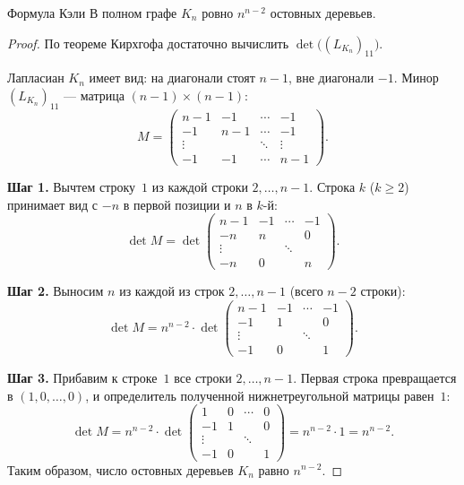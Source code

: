 \begin{Theorem}{Формула Кэли}{}
	В полном графе $K_n$ ровно $n^{n-2}$ остовных деревьев.
\end{Theorem}

\begin{proof}
	По теореме Кирхгофа достаточно вычислить $\det\!\bigl((L_{K_n})_{11}\bigr)$.

	Лапласиан $K_n$ имеет вид: на диагонали стоят $n{-}1$, вне диагонали $-1$. Минор
	$(L_{K_n})_{11}$ — матрица $(n{-}1)\times(n{-}1)$:
	\[
	M = \begin{pmatrix}
		n{-}1 & -1 & \cdots & -1 \\
		-1 & n{-}1 & \cdots & -1 \\
		\vdots & & \ddots & \vdots \\
		-1 & -1 & \cdots & n{-}1
	\end{pmatrix}.
	\]

	\textbf{Шаг 1.} Вычтем строку~$1$ из каждой строки $2, \ldots, n{-}1$. Строка $k$ ($k \ge 2$) принимает вид с $-n$ в первой позиции и $n$ в $k$-й:
	\[
	\det M = \det
	\begin{pmatrix}
		n{-}1 & -1 & \cdots & -1 \\
		-n & n & & 0 \\
		\vdots & & \ddots & \\
		-n & 0 & & n
	\end{pmatrix}.
	\]

	\textbf{Шаг 2.} Выносим $n$ из каждой из строк $2, \ldots, n{-}1$ (всего $n{-}2$ строки):
	\[
	\det M = n^{n-2} \cdot \det
	\begin{pmatrix}
		n{-}1 & -1 & \cdots & -1 \\
		-1 & 1 & & 0 \\
		\vdots & & \ddots & \\
		-1 & 0 & & 1
	\end{pmatrix}.
	\]

	\textbf{Шаг 3.} Прибавим к строке~$1$ все строки $2, \ldots, n{-}1$. Первая строка превращается в $(1, 0, \ldots, 0)$, и определитель полученной нижнетреугольной матрицы равен~$1$:
	\[
	\det M = n^{n-2} \cdot \det
	\begin{pmatrix}
		1 & 0 & \cdots & 0 \\
		-1 & 1 & & 0 \\
		\vdots & & \ddots & \\
		-1 & 0 & & 1
	\end{pmatrix}
	= n^{n-2} \cdot 1 = n^{n-2}.
	\]
	Таким образом, число остовных деревьев $K_n$ равно $n^{n-2}$.
\end{proof}
